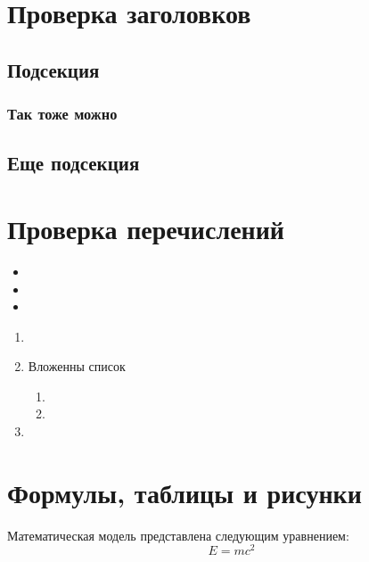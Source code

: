 \documentclass{article}
\begin{document}
\tableofcontents

\lipsum[1]

\section{Проверка заголовков}
\subsection{Подсекция}
\lipsum[1]
\subsubsection{\lipsum[3]} 
\subsubsection{}\lipsum[4] %
\subsubsection{Так тоже можно}\lipsum[4] %
\subsection{Еще подсекция}
\lipsum[5]
\section{Проверка перечислений}
\begin{itemize}
    \item \lipsum[6]
    \item \lipsum[7]
    \item \lipsum[8]
\end{itemize}
\begin{enumerate}
    \item \lipsum[9]
    \item Вложенны список
    \begin{enumerate}
        \item \lipsum[10]
        \item \lipsum[11]
    \end{enumerate}
        \item \lipsum[12]
\end{enumerate}

\section{Формулы, таблицы и рисунки}
Математическая модель представлена следующим уравнением: \begin{equation} E =
mc^2 \end{equation}
\end{document}
